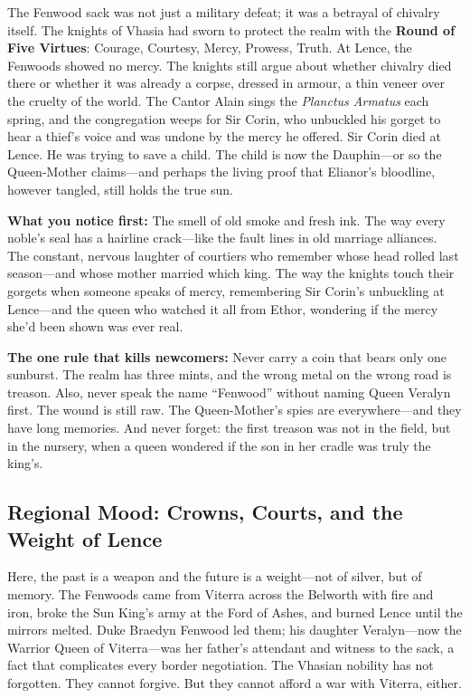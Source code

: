 \begin{tcolorbox}[colback=black!3,colframe=blue!60!black,title={Theme \& Atmosphere},breakable]
The Fenwood sack was not just a military defeat; it was a betrayal of chivalry itself. The knights of Vhasia had sworn to protect the realm with the \textbf{Round of Five Virtues}: Courage, Courtesy, Mercy, Prowess, Truth. At Lence, the Fenwoods showed no mercy. The knights still argue about whether chivalry died there or whether it was already a corpse, dressed in armour, a thin veneer over the cruelty of the world. The Cantor Alain sings the \textit{Planctus Armatus} each spring, and the congregation weeps for Sir Corin, who unbuckled his gorget to hear a thief's voice and was undone by the mercy he offered. Sir Corin died at Lence. He was trying to save a child. The child is now the Dauphin---or so the Queen-Mother claims---and perhaps the living proof that Elianor's bloodline, however tangled, still holds the true sun.

\vspace{2mm}
\textbf{What you notice first:} The smell of old smoke and fresh ink. The way every noble's seal has a hairline crack---like the fault lines in old marriage alliances. The constant, nervous laughter of courtiers who remember whose head rolled last season---and whose mother married which king. The way the knights touch their gorgets when someone speaks of mercy, remembering Sir Corin's unbuckling at Lence---and the queen who watched it all from Ethor, wondering if the mercy she'd been shown was ever real.

\textbf{The one rule that kills newcomers:} Never carry a coin that bears only one sunburst. The realm has three mints, and the wrong metal on the wrong road is treason. Also, never speak the name ``Fenwood'' without naming Queen Veralyn first. The wound is still raw. The Queen-Mother's spies are everywhere---and they have long memories. And never forget: the first treason was not in the field, but in the nursery, when a queen wondered if the son in her cradle was truly the king's.
\end{tcolorbox}

\subsection*{Regional Mood: Crowns, Courts, and the Weight of Lence}

Here, the past is a weapon and the future is a weight---not of silver, but of memory. The Fenwoods came from Viterra across the Belworth with fire and iron, broke the Sun King's army at the Ford of Ashes, and burned Lence until the mirrors melted. Duke Braedyn Fenwood led them; his daughter Veralyn---now the Warrior Queen of Viterra---was her father's attendant and witness to the sack, a fact that complicates every border negotiation. The Vhasian nobility has not forgotten. They cannot forgive. But they cannot afford a war with Viterra, either.

